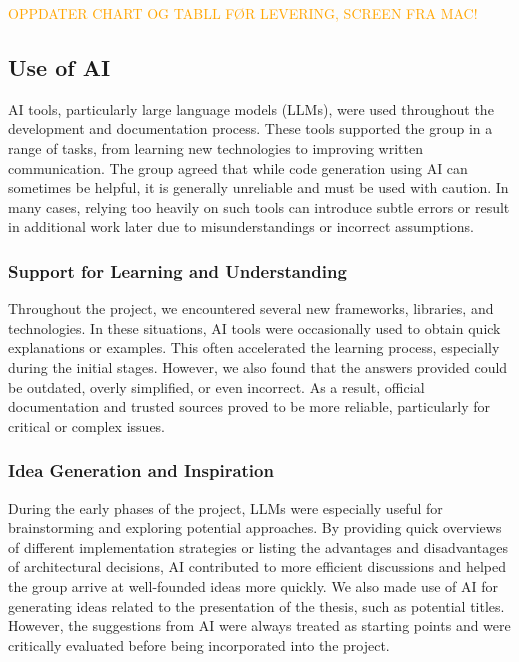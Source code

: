 \textcolor{orange}{OPPDATER CHART OG TABLL FØR LEVERING, SCREEN FRA MAC!}


\subsection{Use of AI}

AI tools, particularly large language models (LLMs), were used throughout the development and documentation process. These tools supported the group in a range of tasks, from learning new technologies to improving written communication. The group agreed that while code generation using AI can sometimes be helpful, it is generally unreliable and must be used with caution. In many cases, relying too heavily on such tools can introduce subtle errors or result in additional work later due to misunderstandings or incorrect assumptions.

\subsubsection{Support for Learning and Understanding}

Throughout the project, we encountered several new frameworks, libraries, and technologies. In these situations, AI tools were occasionally used to obtain quick explanations or examples. This often accelerated the learning process, especially during the initial stages. However, we also found that the answers provided could be outdated, overly simplified, or even incorrect. As a result, official documentation and trusted sources proved to be more reliable, particularly for critical or complex issues.

\subsubsection{Idea Generation and Inspiration}

During the early phases of the project, LLMs were especially useful for brainstorming and exploring potential approaches. By providing quick overviews of different implementation strategies or listing the advantages and disadvantages of architectural decisions, AI contributed to more efficient discussions and helped the group arrive at well-founded ideas more quickly. We also made use of AI for generating ideas related to the presentation of the thesis, such as potential titles. However, the suggestions from AI were always treated as starting points and were critically evaluated before being incorporated into the project.


